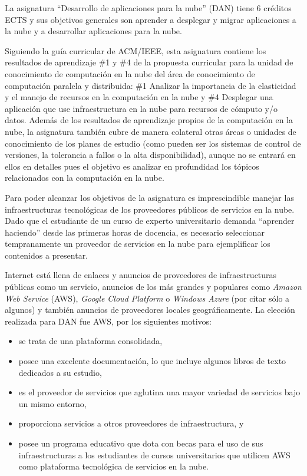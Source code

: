 \documentclass[conference]{IEEEtran}
\begin{document}
La asignatura ``Desarrollo de aplicaciones para la nube'' (DAN) tiene 6 créditos
ECTS y sus objetivos generales son aprender a desplegar y migrar aplicaciones a la
nube y a desarrollar aplicaciones para la nube.

Siguiendo la guía curricular de ACM/IEEE, esta asignatura contiene los resultados de aprendizaje 
\#1 y \#4 de la propuesta curricular para la unidad de conocimiento de computación en la nube del 
área de conocimiento de computación paralela y distribuida: \#1 Analizar la importancia de la 
elasticidad y el manejo de recursos en la computación en la nube y \#4 Desplegar una aplicación que 
use infraestructura en la nube para recursos de cómputo y/o datos. Además de los resultados de 
aprendizaje propios de la computación en la nube, la asignatura también cubre de manera colateral 
otras áreas o unidades de conocimiento de los planes de estudio (como pueden ser los sistemas de control de 
versiones, la tolerancia a fallos o la alta disponibilidad), aunque no se entrará en ellos en 
detalles pues el objetivo es analizar en profundidad los tópicos relacionados con la computación 
en la nube.


Para poder alcanzar los objetivos de la asignatura es imprescindible  manejar las infraestructuras 
tecnológicas de los proveedores públicos de servicios en la nube. Dado que el estudiante de un curso de
experto universitario demanda ``aprender haciendo'' desde las primeras horas de docencia, es necesario 
seleccionar tempranamente un proveedor de servicios en la nube para ejemplificar los contenidos a
presentar.

Internet está llena de enlaces y anuncios de proveedores de infraestructuras públicas
como un servicio, anuncios de los más grandes y populares como \textit{Amazon
Web Service} (AWS), \textit{Google Cloud Platform} o \textit{Windows Azure} (por
citar sólo a algunos) y también anuncios de proveedores locales geográficamente.
La elección realizada para DAN fue AWS, por los siguientes motivos:
\begin{itemize}
\item se trata de una plataforma consolidada,
\item posee una excelente documentación, lo que incluye algunos libros de texto dedicados a su estudio,
\item es el proveedor de servicios que aglutina una mayor variedad de servicios bajo un mismo entorno,
\item proporciona servicios a otros proveedores de infraestructura, y
\item posee un programa educativo que dota con becas para el uso de sus infraestructuras a los estudiantes 
de cursos universitarios que utilicen AWS como plataforma tecnológica de servicios en la nube.
\end{itemize}
\end{document}
